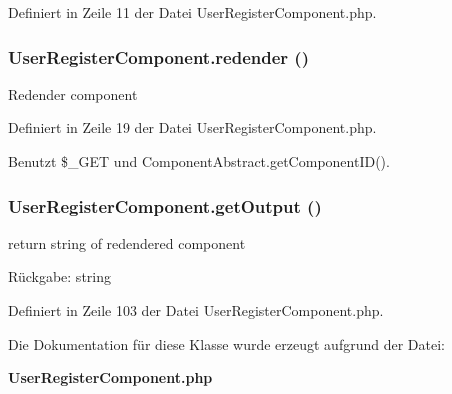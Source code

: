 Definiert in Zeile 11 der Datei UserRegisterComponent.php.
\subsubsection{\setlength{\rightskip}{0pt plus 5cm}UserRegisterComponent.redender ()}\label{classUserRegisterComponent_de635d3e68bf646897b503ccf5dae7ab}


Redender component 

Definiert in Zeile 19 der Datei UserRegisterComponent.php.

Benutzt \$\_\-GET und ComponentAbstract.getComponentID().
\subsubsection{\setlength{\rightskip}{0pt plus 5cm}UserRegisterComponent.getOutput ()}\label{classUserRegisterComponent_17cfa6f974893b73264b0e8b63f82721}


return string of redendered component

\begin{Desc}
\item[Rückgabe:]string \end{Desc}


Definiert in Zeile 103 der Datei UserRegisterComponent.php.

Die Dokumentation für diese Klasse wurde erzeugt aufgrund der Datei:\begin{CompactItemize}
\item 
{\bf UserRegisterComponent.php}\end{CompactItemize}
